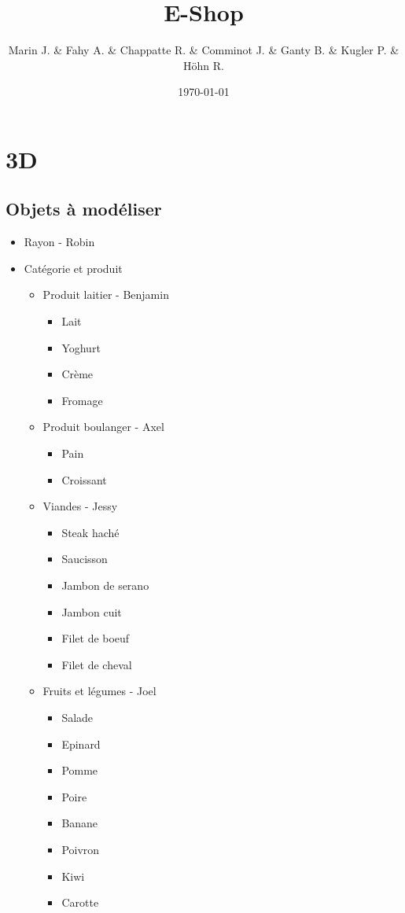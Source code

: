 \documentclass[a4paper]{article}
\title{E-Shop}
\author{Marin J. \& Fahy A. \& Chappatte R. \& Comminot J. \& Ganty B. \& Kugler P. \& Höhn R.}
\date{\today}
\begin{document}
\maketitle

\section{3D}
\subsection{Objets à modéliser}
\begin{itemize}
\item Rayon - Robin
\item Catégorie et produit
\begin{itemize}
\item Produit laitier - Benjamin
\begin{itemize}
\item Lait
\item Yoghurt
\item Crème
\item Fromage
\end{itemize}
\item Produit boulanger - Axel
\begin{itemize}
\item Pain
\item Croissant
\end{itemize}
\item Viandes - Jessy
\begin{itemize}
\item Steak haché
\item Saucisson
\item Jambon de serano
\item Jambon cuit
\item Filet de boeuf
\item Filet de cheval
\end{itemize}
\item Fruits et légumes - Joel
\begin{itemize}
\item Salade
\item Epinard
\item Pomme
\item Poire
\item Banane
\item Poivron
\item Kiwi
\item Carotte
\end{itemize}

\end{itemize}
\end{itemize}
\end{document}
